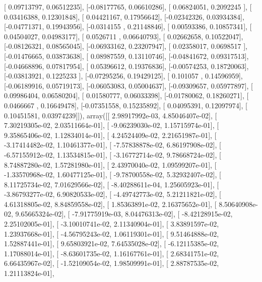 \documentclass{article}
\begin{document}
       [ 0.09713797,  0.06512235],
       [-0.08177765,  0.06610286],
       [ 0.06824051,  0.2092245 ],
       [ 0.03416388,  0.12301848],
       [ 0.04421167,  0.17956642],
       [-0.02342326,  0.03934384],
       [-0.04771371,  0.19943956],
       [-0.0314155 ,  0.21148846],
       [ 0.00593386,  0.10857341],
       [ 0.04504027,  0.04983177],
       [ 0.0526711 ,  0.06640793],
       [ 0.02662658,  0.10522047],
       [-0.08126321,  0.08565045],
       [-0.06933162,  0.23207947],
       [ 0.02358017,  0.0698517 ],
       [-0.01476665,  0.03873638],
       [ 0.08987559,  0.13110746],
       [-0.04841672,  0.09317513],
       [-0.04668896,  0.07817954],
       [ 0.05396612,  0.19376836],
       [-0.00574253,  0.18720063],
       [-0.03813921,  0.1225233 ],
       [-0.07295256,  0.19429125],
       [ 0.101057  ,  0.14596959],
       [-0.06189916,  0.05719173],
       [-0.06053083,  0.05004637],
       [-0.09309657,  0.05977897],
       [ 0.09986404,  0.06580204],
       [ 0.01580777,  0.06033398],
       [-0.01780062,  0.18260271],
       [ 0.0466667 ,  0.16649478],
       [-0.07351558,  0.15235892],
       [ 0.04095391,  0.12097974],
       [ 0.10451581,  0.03974239]]), array([[  2.98917992e-03,   4.85046407e-02],
       [  7.30219305e-02,   2.03511664e-01],
       [ -9.06239030e-02,   1.15715974e-01],
       [  9.35865406e-02,   1.12834014e-01],
       [  4.24524409e-02,   2.21651987e-01],
       [ -3.17414482e-02,   1.10461377e-01],
       [ -7.57838878e-02,   6.86197908e-02],
       [ -6.57155912e-02,   1.13534815e-01],
       [ -3.16772714e-02,   9.78668724e-02],
       [  8.74887280e-02,   1.57281980e-01],
       [  2.43970040e-02,   1.09599207e-01],
       [ -1.33570968e-02,   1.60477125e-01],
       [ -9.78700558e-02,   5.32932407e-02],
       [  8.11725734e-02,   7.01629566e-02],
       [ -8.40288611e-04,   1.25605923e-01],
       [ -3.86793277e-02,   6.90820533e-02],
       [ -4.49742773e-02,   5.21211821e-02],
       [  4.61318805e-02,   8.84859558e-02],
       [  1.85363891e-02,   2.16375652e-01],
       [  8.50640908e-02,   9.65665324e-02],
       [ -7.91775919e-03,   8.04476313e-02],
       [ -8.42128915e-02,   2.25102005e-01],
       [ -3.10010741e-02,   2.11340904e-01],
       [  3.83891597e-02,   1.23937668e-01],
       [ -4.56795243e-02,   1.06119301e-01],
       [  9.51464888e-02,   1.52887441e-01],
       [  9.65803921e-02,   7.64535028e-02],
       [ -6.12115385e-02,   1.17088014e-01],
       [ -8.63601735e-02,   1.16167761e-01],
       [  2.68341751e-02,   6.66435967e-02],
       [ -1.52109054e-02,   1.98509991e-01],
       [  2.88787535e-02,   1.21113824e-01],
\end{document}

